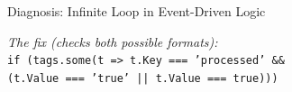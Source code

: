 \begin{frame}{Diagnosis: Infinite Loop in Event-Driven Logic}
\begin{tabular}
    \end{tabular}
    
    \vspace{0.5cm}
    
    \begin{tcolorbox}[colback=black!85, colframe=black!85, arc=2pt, coltext=white, width=0.85\textwidth]
        \scriptsize \textit{\color{gray!50}The fix (checks both possible formats):}\\[0.2cm]
        \textcolor{green!50!white}{\texttt{if (tags.some(t => t.Key === 'processed' \&\&}} \\ 
        \textcolor{green!50!white}{\texttt{\hspace{1cm}(t.Value === 'true' || t.Value === true)))}}
    \end{tcolorbox}
    
\end{frame}